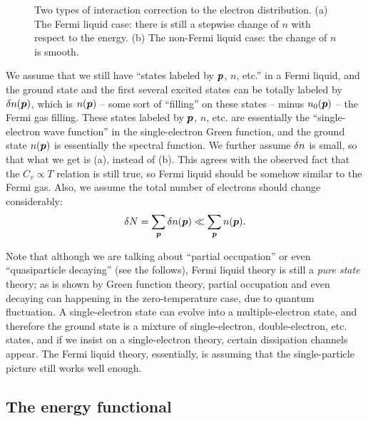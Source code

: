 \documentclass[hyperref, a4paper]{article}
\begin{document}
\begin{figure}
    \centering
    
    \caption{Two types of interaction correction to the electron distribution.
    (a) The Fermi liquid case: there is still a stepwise change of $n$ with respect to the energy.
    (b) The non-Fermi liquid case: the change of $n$ is smooth.}
    \label{fig:fermi-liquid-distribution}
\end{figure}

We assume that we still have ``states labeled by $\vb*{p}$, $n$, etc.'' 
in a Fermi liquid,
and the ground state and the first several excited states 
can be totally labeled by $\var{n(\vb*{p})}$,
which is $n(\vb*{p})$ -- some sort of ``filling'' on these states -- 
minus $n_0(\vb*{p})$ -- the Fermi gas filling. 
These states labeled by $\vb*{p}$, $n$, etc. 
are essentially the ``single-electron wave function''
in the single-electron Green function, 
and the ground state $n(\vb*{p})$ is essentially the spectral function.
We further assume $\var{n}$ is small, so that what we get is (a),
instead of (b).
This agrees with the observed fact that the $C_v \propto T$ relation is still true,
so Fermi liquid should be somehow similar to the Fermi gas. 
Also, we assume the total number of electrons 
should change considerably:
\begin{equation}
    \var{N} = \sum_{\vb*{p}} \var{n(\vb*{p})} \ll \sum_{\vb*{p}} n(\vb*{p}). 
\end{equation}

Note that although we are talking about ``partial occupation''
or even ``quasiparticle decaying'' (see the follows), 
Fermi liquid theory is still a \emph{pure state} theory; 
as is shown by Green function theory, 
partial occupation and even decaying can happening 
in the zero-temperature case, 
due to quantum fluctuation.
A single-electron state can evolve into a multiple-electron state, 
and therefore the ground state is a mixture of single-electron, double-electron, etc. states, 
and if we insist on a single-electron theory,
certain dissipation channels appear.
The Fermi liquid theory, essentially, 
is assuming that the single-particle picture still works well enough.

\subsection{The energy functional}
\end{document}

